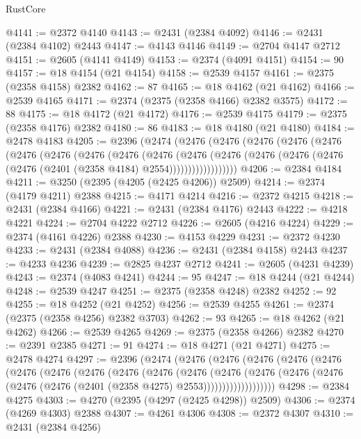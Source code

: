 \begin{lexlean}{RustCore}
\begin{coremodule}
@4141 := @2372 @4140
@4143 := @2431 (@2384 @4092)
@4146 := @2431 (@2384 @4102) @2443
@4147 := @4143 @4146
@4149 := @2704 @4147 @2712
@4151 := @2605 (@4141 @4149)
@4153 := @2374 (@4091 @4151)
@4154 := 90
@4157 := @18 @4154 (@21 @4154)
@4158 := @2539 @4157
@4161 := @2375 (@2358 @4158) @2382
@4162 := 87
@4165 := @18 @4162 (@21 @4162)
@4166 := @2539 @4165
@4171 := @2374 (@2375 (@2358 @4166) @2382 @3575)
@4172 := 88
@4175 := @18 @4172 (@21 @4172)
@4176 := @2539 @4175
@4179 := @2375 (@2358 @4176) @2382
@4180 := 86
@4183 := @18 @4180 (@21 @4180)
@4184 := @2478 @4183
@4205 := @2396
    (@2474
      (@2476
        (@2476
          (@2476
            (@2476
              (@2476
                (@2476
                  (@2476
                    (@2476
                      (@2476
                        (@2476
                          (@2476
                            (@2476
                              (@2476
                                (@2476 (@2476 (@2476 (@2401 (@2358 @4184) @2554))))))))))))))))))
@4206 := @2384 @4184
@4211 := @3250 (@2395 (@4205 (@2425 @4206)) @2509)
@4214 := @2374 (@4179 @4211) @2388
@4215 := @4171 @4214
@4216 := @2372 @4215
@4218 := @2431 (@2384 @4166)
@4221 := @2431 (@2384 @4176) @2443
@4222 := @4218 @4221
@4224 := @2704 @4222 @2712
@4226 := @2605 (@4216 @4224)
@4229 := @2374 (@4161 @4226) @2388
@4230 := @4153 @4229
@4231 := @2372 @4230
@4233 := @2431 (@2384 @4088)
@4236 := @2431 (@2384 @4158) @2443
@4237 := @4233 @4236
@4239 := @2825 @4237 @2712
@4241 := @2605 (@4231 @4239)
@4243 := @2374 (@4083 @4241)
@4244 := 95
@4247 := @18 @4244 (@21 @4244)
@4248 := @2539 @4247
@4251 := @2375 (@2358 @4248) @2382
@4252 := 92
@4255 := @18 @4252 (@21 @4252)
@4256 := @2539 @4255
@4261 := @2374 (@2375 (@2358 @4256) @2382 @3703)
@4262 := 93
@4265 := @18 @4262 (@21 @4262)
@4266 := @2539 @4265
@4269 := @2375 (@2358 @4266) @2382
@4270 := @2391 @2385
@4271 := 91
@4274 := @18 @4271 (@21 @4271)
@4275 := @2478 @4274
@4297 := @2396
    (@2474
      (@2476
        (@2476
          (@2476
            (@2476
              (@2476
                (@2476
                  (@2476
                    (@2476
                      (@2476
                        (@2476
                          (@2476
                            (@2476
                              (@2476
                                (@2476
                                  (@2476 (@2476 (@2476 (@2401 (@2358 @4275) @2553)))))))))))))))))))
@4298 := @2384 @4275
@4303 := @4270 (@2395 (@4297 (@2425 @4298)) @2509)
@4306 := @2374 (@4269 @4303) @2388
@4307 := @4261 @4306
@4308 := @2372 @4307
@4310 := @2431 (@2384 @4256)

\end{coremodule}
\end{lexlean}
